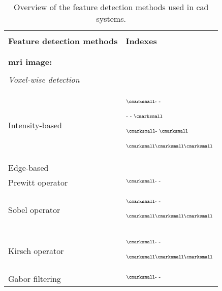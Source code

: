 \thispagestyle{empty}
\begin{table}
  \centering
  \caption{Overview of the feature detection methods used in \ac{cad} systems.}\label{tab:feat}
  \footnotesize
  \begin{threeparttable}
    \renewcommand{\arraystretch}{.7}
    \begin{tabular}{p{.5\linewidth} p{.4\linewidth}}
      \hline \\ [-1.5ex]
      \textbf{Feature detection methods} & \textbf{Indexes} \\ \\ [-1.5ex]
      \hline \\ [-1.5ex]
      \textbf{\ac{mri} image:} & \\ \\ [-1.5ex]
      \quad \textit{Voxel-wise detection} &  \\ \\ [-1.5ex]
      \quad \quad Intensity-based & $^{\text{{\cmarksmall}- -}}$\cite{Ampeliotis2007,Ampeliotis2008,Vos2008}\par $^{\text{- - {\cmarksmall}}}$\cite{Giannini2013}\par $^{\text{{\cmarksmall}- {\cmarksmall}}}$\cite{Artan2009,Artan2010,Chan2003,Langer2009,Litjens2011,Litjens2012,Litjens2014,Liu2009,Ozer2009,Ozer2010}\par $^{\text{{\cmarksmall}{\cmarksmall}{\cmarksmall}}}$\cite{Niaf2011,Niaf2012} \\ 
      \quad \quad Edge-based & \\
      \quad \quad \quad Prewitt operator & $^{\text{{\cmarksmall}- -}}$\cite{Tiwari2009a,Tiwari2010,Tiwari2013,Viswanath2008} \\
      \quad \quad \quad Sobel operator & $^{\text{{\cmarksmall}- -}}$\cite{Tiwari2009a,Tiwari2010,Tiwari2013,Viswanath2008,Viswanath2009,Viswanath2011,Viswanath2012}\par $^{\text{{\cmarksmall}{\cmarksmall}{\cmarksmall}}}$\cite{Niaf2011,Niaf2012} \\
      \quad \quad \quad Kirsch operator & $^{\text{{\cmarksmall}- -}}$\cite{Tiwari2009a,Tiwari2010,Tiwari2013,Viswanath2008,Viswanath2009,Viswanath2011,Viswanath2012}\par $^{\text{{\cmarksmall}{\cmarksmall}{\cmarksmall}}}$\cite{Niaf2011,Niaf2012} \\
      \quad \quad \quad Gabor filtering & $^{\text{{\cmarksmall}- -}}$\cite{Tiwari2012,Viswanath2008,Viswanath2012} \\ 

\end{tabular}
\end{threeparttable}
\end{table}
